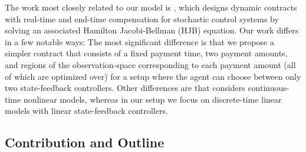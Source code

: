 \documentclass[letterpaper, 10 pt, conference]{ieeeconf}  %
\begin{document}
The work most closely related to our model is \cite{Yang2014}, which designs dynamic contracts with real-time and end-time compensation for stochastic control systems by solving an associated Hamilton Jacobi-Bellman (HJB) equation. Our work differs in a few notable ways: The most significant difference is that we propose a simpler contract that consists of a fixed payment time, two payment amounts, and regions of the observation-space corresponding to each payment amount (all of which are optimized over) for a setup where the agent can choose between only two state-feedback controllers. Other differences are that \cite{Yang2014} considers continuous-time nonlinear models, whereas in our setup we focus on discrete-time linear models with linear state-feedback controllers.

\subsection{Contribution and Outline}
 


\end{document}
